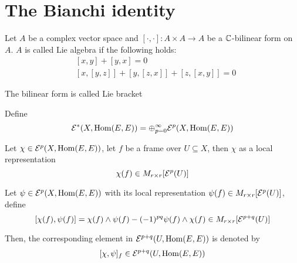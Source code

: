 \section{The Bianchi identity}

\begin{definition}
	Let $A$ be a complex vector space and $[\cdot,\cdot]: A \times A \to A$ be a $\mathbb{C}$-bilinear form on $A$. $A$ is called Lie algebra if the following holds:
	\begin{align*}
		&[x, y] + [y, x] = 0\\
		&[x, [y, z]] + [y, [z, x]] + [z, [x, y]] = 0
	\end{align*}
	
	The bilinear form is called Lie bracket
	
\end{definition}

\begin{definition}
	Define
	$$
	\mathcal{E}^*(X, \operatorname{Hom}(E, E)) = \oplus_{p = 0}^\infty \mathcal{E}^p(X, \operatorname{Hom}(E, E))
	$$
	
	Let $\chi \in \mathcal{E}^p(X, \operatorname{Hom}(E, E))$, let $f$ be a frame over $U \subseteq X$, then $\chi$ as a local representation
	$$
		\chi(f) \in M_{r \times r}[\mathcal{E}^p(U)]
	$$
	
	Let $\psi \in \mathcal{E}^p(X, \operatorname{Hom}(E, E))$ with its local representation $\psi(f) \in M_{r \times r}[\mathcal{E}^p(U)]$, define
	$$
		[\chi(f), \psi(f)] = \chi(f) \wedge \psi(f) - (-1)^{pq} \psi(f) \wedge \chi(f) \in M_{r \times r}[\mathcal{E}^{p+q}(U)]
	$$
	
	Then, the corresponding element in $\mathcal{E}^{p+q}(U, \operatorname{Hom}(E, E))$ is denoted by
	$$
		[\chi, \psi]_f \in \mathcal{E}^{p+q}(U, \operatorname{Hom}(E, E))
	$$
	
	
	
\end{definition}

